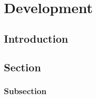 \chapter{Development}

\section{Introduction}

\lipsum[1-4]

\section{Section}

\lipsum[2-4]

\subsection{Subsection}

\lipsum[2-4]